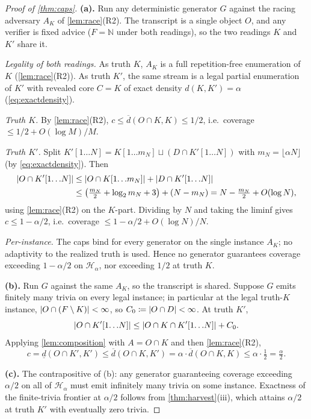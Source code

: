 \documentclass[11pt]{article}
\numberwithin{equation}{section}
\newcommand{\N}{\mathbb{N}}
\newcommand{\mc}[1]{\mathcal{#1}}
\newcommand{\defeq}{\coloneqq}
\DeclarePairedDelimiter{\abs}{\lvert}{\rvert}
\newcommand{\Amb}{F}
\newcommand{\Hcal}{\mc{H}}
\newcommand{\Hfam}{\Hcal_{\alpha}}
\newcommand{\Out}{O}
\newcommand{\Core}{C}
\newcommand{\dlow}[2]{\underline{d}(#1,#2)}
\newcommand{\dup}[2]{\overline{d}(#1,#2)}
\newcommand{\dens}[2]{d(#1,#2)}
\newcommand{\cov}{c}
\newcommand{\rest}[2]{#1[1\!\dots\! #2]}
\theoremstyle{plain}
\theoremstyle{definition}
\theoremstyle{remark}
\begin{document}
\begin{proof}[Proof of \cref{thm:caps}]
\medskip\noindent\textbf{(a).}\quad
Run any deterministic generator $G$ against the racing adversary $A_K$ of \cref{lem:race}(R2).
The transcript is a single object $\Out$, and any verifier is fixed advice ($\Amb = \N$ under
both readings), so the two readings $K$ and $K'$ share it.

\emph{Legality of both readings.} As truth $K$, $A_K$ is a full repetition-free enumeration of
$K$ (\cref{lem:race}(R2)). As truth $K'$, the same stream is a legal partial enumeration of
$K'$ with revealed core $\Core = K$ of exact density $\dens{K}{K'} = \alpha$
(\eqref{eq:exactdensity}).

\emph{Truth $K$.} By \cref{lem:race}(R2), $\cov \le \dup{\Out \cap K}{K} \le 1/2$, i.e.\
coverage $\le 1/2 + O(\log M)/M$.

\emph{Truth $K'$.} Split $\rest{K'}{N} = \rest{K}{m_N} \sqcup (D \cap \rest{K'}{N})$ with $m_N
= \lfloor \alpha N \rfloor$ (by \eqref{eq:exactdensity}). Then
\begin{align*}
  \abs{\Out \cap \rest{K'}{N}}
  &\le \abs{\Out \cap \rest{K}{m_N}} + \abs{D \cap \rest{K'}{N}}\\
  &\le \bigl(\tfrac{m_N}{2} + \log_2 m_N + 3\bigr) + (N - m_N)
  = N - \tfrac{m_N}{2} + O(\log N),
\end{align*}
using \cref{lem:race}(R2) on the $K$-part. Dividing by $N$ and taking the liminf gives $\cov
\le 1 - \alpha/2$, i.e.\ coverage $\le 1 - \alpha/2 + O(\log N)/N$.

\emph{Per-instance.} The caps bind for every generator on the single instance $A_K$; no
adaptivity to the realized truth is used. Hence no generator guarantees coverage exceeding $1
- \alpha/2$ on $\Hfam$, nor exceeding $1/2$ at truth $K$.

\medskip\noindent\textbf{(b).}\quad
Run $G$ against the same $A_K$, so the transcript is shared. Suppose $G$ emits finitely many
trivia on every legal instance; in particular at the legal truth-$K$ instance, $\abs{\Out \cap
(\Amb \setminus K)} < \infty$, so $C_0 \defeq \abs{\Out \cap D} < \infty$. At truth $K'$,
\begin{equation*}
  \abs{\Out \cap \rest{K'}{N}}
  \le \abs{\Out \cap K \cap \rest{K'}{N}} + C_0 .
\end{equation*}
Applying \cref{lem:composition} with $A = \Out \cap K$ and then \cref{lem:race}(R2),
\begin{equation*}
  \cov = \dlow{\Out \cap K'}{K'}
  \le \dup{\Out \cap K}{K'}
  = \alpha \cdot \dup{\Out \cap K}{K}
  \le \alpha \cdot \tfrac12 = \tfrac{\alpha}{2}.
\end{equation*}

\medskip\noindent\textbf{(c).}\quad
The contrapositive of (b): any generator guaranteeing coverage exceeding $\alpha/2$ on all of
$\Hfam$ must emit infinitely many trivia on some instance. Exactness of the finite-trivia
frontier at $\alpha/2$ follows from \cref{thm:harvest}(iii), which attains $\alpha/2$ at truth
$K'$ with eventually zero trivia.
\end{proof}
\end{document}
